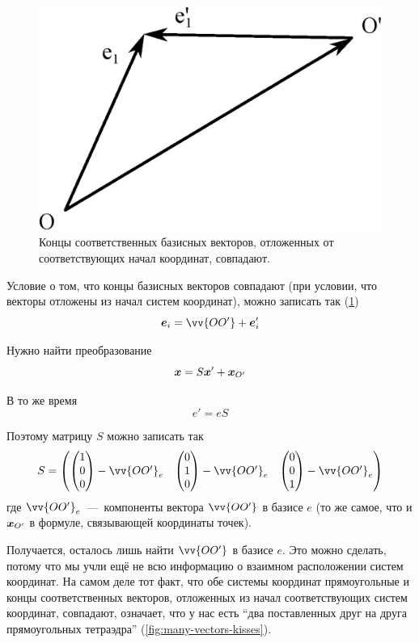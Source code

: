 \documentclass[a4paper,12pt]{article}
\begin{document}
  \begin{solution}
    \begin{figure}[h]
      \centering
    
      \includegraphics[width=0.5\columnwidth]{two-vectors-kiss}
    
      \caption{Концы соответственных базисных векторов, отложенных от соответствующих начал координат, совпадают.}
      \label{fig:two-vectors-kiss}
    \end{figure}
    
    Условие о том, что концы базисных векторов совпадают (при условии, что векторы отложены из начал систем координат), можно записать так (\ref{fig:two-vectors-kiss})
    \[
      \bds e_i = \vv{OO'} + \bds e_i'
    \]
    
    Нужно найти преобразование
    \[
      \boldsymbol x = S \boldsymbol x' + \boldsymbol x_{O'}
    \]
    
    В то же время
    \[
      e' = e S
    \]
    
    Поэтому матрицу $S$ можно записать так
    \[
      S = \begin{pmatrix}
        \begin{pmatrix}1\\ 0\\ 0\end{pmatrix} - \vv{OO'}_{e}
        & \begin{pmatrix}0\\ 1\\ 0\end{pmatrix} - \vv{OO'}_{e}
        & \begin{pmatrix}0\\ 0\\ 1\end{pmatrix} - \vv{OO'}_{e}
      \end{pmatrix}
    \]
    где $\vv{OO'}_{e}$~---~компоненты вектора $\vv{OO'}$ в базисе $e$ (то же самое, что и $\boldsymbol x_{O'}$ в формуле, связывающей координаты точек).
    
    Получается, осталось лишь найти $\vv{OO'}$ в базисе $e$.
    Это можно сделать, потому что мы учли ещё не всю информацию о взаимном расположении систем координат.
    На самом деле тот факт, что обе системы координат прямоугольные и концы соответственных векторов, отложенных из начал соответствующих систем координат, совпадают, означает, что у нас есть ``два поставленных друг на друга прямоугольных тетраэдра'' (\ref{fig:many-vectors-kisses}).
    

\end{solution}
\end{document}
